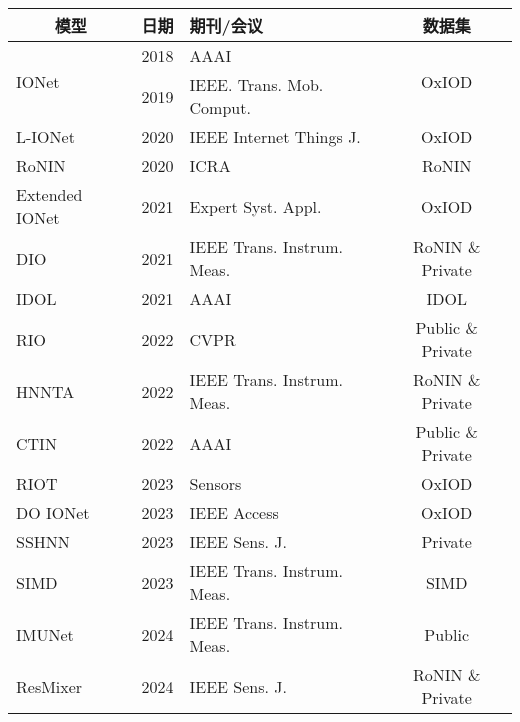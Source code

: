\begin{frame}
	{\scriptsize
		\begin{tabular*}{\textwidth}{@{\extracolsep{\fill}}lclc}
			\toprule
			\multicolumn{1}{c}{模型} & 日期 & 期刊/会议 & 数据集 \\
			\midrule
			\multirow{2}{*}{IONet} & 2018 & AAAI                            & \multirow{2}{*}{OxIOD} \\ %
			                       & 2019 & IEEE. Trans. Mob. Comput.       &                        \\ %
			               L-IONet & 2020 & IEEE Internet Things J.         & OxIOD                  \\ %
			                 RoNIN & 2020 & ICRA                            & RoNIN                  \\ %
			        Extended IONet & 2021 & Expert Syst. Appl.              & OxIOD                   \\ 
			                   DIO & 2021 & IEEE Trans. Instrum. Meas.      & RoNIN \& Private       \\ %
			                  IDOL & 2021 & AAAI                            & IDOL                   \\ %
			                   RIO & 2022 & CVPR                            & Public \& Private      \\ %
			                 HNNTA & 2022 & IEEE Trans. Instrum. Meas.      & RoNIN \& Private       \\ %
			                  CTIN & 2022 & AAAI                            & Public \& Private      \\ %
			                  RIOT & 2023 & Sensors                         & OxIOD                  \\
			              DO IONet & 2023 & IEEE Access                     & OxIOD                  \\
			                 SSHNN & 2023 & IEEE Sens. J.                   & Private                \\
			                  SIMD & 2023 & IEEE Trans. Instrum. Meas.      & SIMD                   \\ %
			                IMUNet & 2024 & IEEE Trans. Instrum. Meas.      & Public                 \\
			              ResMixer & 2024 & IEEE Sens. J.                   & RoNIN \& Private       \\
			\bottomrule
		\end{tabular*}        
	}
	
\end{frame}


